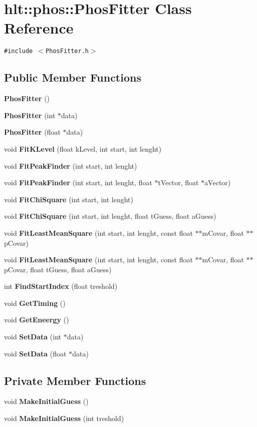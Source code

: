 \section{hlt::phos::Phos\-Fitter Class Reference}
\label{classhlt_1_1phos_1_1PhosFitter}
{\tt \#include $<$Phos\-Fitter.h$>$}

\subsection*{Public Member Functions}
\begin{CompactItemize}
\item 
{\bf Phos\-Fitter} ()
\item 
{\bf Phos\-Fitter} (int $\ast$data)
\item 
{\bf Phos\-Fitter} (float $\ast$data)
\item 
void {\bf Fit\-KLevel} (float k\-Level, int start, int lenght)
\item 
void {\bf Fit\-Peak\-Finder} (int start, int lenght)
\item 
void {\bf Fit\-Peak\-Finder} (int start, int lenght, float $\ast$t\-Vector, float $\ast$a\-Vector)
\item 
void {\bf Fit\-Chi\-Square} (int start, int lenght)
\item 
void {\bf Fit\-Chi\-Square} (int start, int lenght, float t\-Guess, float a\-Guess)
\item 
void {\bf Fit\-Least\-Mean\-Square} (int start, int lenght, const float $\ast$$\ast$m\-Covar, float $\ast$$\ast$p\-Covar)
\item 
void {\bf Fit\-Least\-Mean\-Square} (int start, int lenght, const float $\ast$$\ast$m\-Covar, float $\ast$$\ast$p\-Covar, float t\-Guess, float a\-Guess)
\item 
int {\bf Find\-Start\-Index} (float treshold)
\item 
void {\bf Get\-Timing} ()
\item 
void {\bf Get\-Eneergy} ()
\item 
void {\bf Set\-Data} (int $\ast$data)
\item 
void {\bf Set\-Data} (float $\ast$data)
\end{CompactItemize}
\subsection*{Private Member Functions}
\begin{CompactItemize}
\item 
void {\bf Make\-Initial\-Guess} ()
\item 
void {\bf Make\-Initial\-Guess} (int treshold)
\end{CompactItemize}
